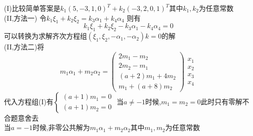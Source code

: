 \documentclass[12pt, a4paper, oneside, UTF8]{ctexbook}
\begin{document}
\begin{enumerate}[label=\arabic*.,start=12]
    \begin{solution}
    (I)比较简单答案是$k_1(5,-3,1,0)^{T}+k_2(-3,2,0,1)^T$其中$k_1,k_2$为任意常数 \\
    (II,方法一) 令$k_1\xi_1+k_2\xi_2=k_3\alpha_1+k_4\alpha_4$ 则有 
    $$
    k_1\xi_1+k_2\xi_2-k_3\alpha_1-k_4\alpha_4 = 0 
    $$
    可以转换为求解齐次方程组$(\xi_1,\xi_2,-\alpha_1,-\alpha_2)k=0$的解 \\
    (II,方法二)将$$
    m_1\alpha_1+m_2\alpha_2 = \begin{pmatrix}
        2m_1-m_2 \\
        2m_2-m_1 \\
        (a+2)m_1 + 4m_2 \\
        m_1 + (a+8)m_2
    \end{pmatrix}\begin{array}{c}
        x_1 \\
        x_2 \\
        x_3 \\
        x_4
    \end{array}
    $$
    代入方程组(I)有$\begin{cases}
        (a+1)m_1 = 0 \\
        (a+1)m_2 = 0
    \end{cases}$
    当$a\neq -1$时候,$m_1=m_2=0$此时只有零解不合题意舍去 \\
    当$a=-1$时候,非零公共解为$m_1\alpha_1+m_2\alpha_2$其中$m_1,m_2$为任意常数
    \end{solution}
\end{enumerate}
\end{document}
